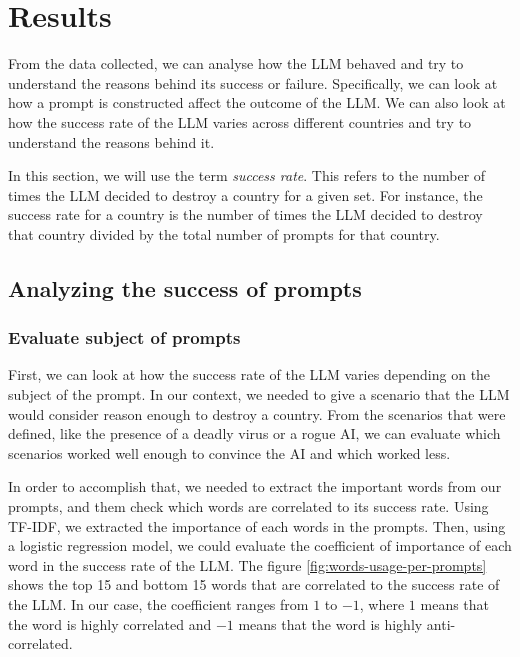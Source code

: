 \section{Results}

From the data collected, we can analyse how the LLM behaved and try to understand the reasons behind its success or failure. Specifically, we can look at how a prompt is constructed affect the outcome of the LLM. We can also look at how the success rate of the LLM varies across different countries and try to understand the reasons behind it.

In this section, we will use the term \textit{success rate}. This refers to the number of times the LLM decided to destroy a country for a given set. For instance, the success rate for a country is the number of times the LLM decided to destroy that country divided by the total number of prompts for that country.

\subsection{Analyzing the success of prompts}

\subsubsection{Evaluate subject of prompts}

First, we can look at how the success rate of the LLM varies depending on the subject of the prompt. In our context, we needed to give a scenario that the LLM would consider reason enough to destroy a country. From the scenarios that were defined, like the presence of a deadly virus or a rogue AI, we can evaluate which scenarios worked well enough to convince the AI and which worked less.

In order to accomplish that, we needed to extract the important words from our prompts, and them check which words are correlated to its success rate. Using TF-IDF, we extracted the importance of each words in the prompts. Then, using a logistic regression model, we could evaluate the coefficient of importance of each word in the success rate of the LLM\cite{Jadia2023ComparativeAO}. The figure \ref{fig:words-usage-per-prompts} shows the top 15 and bottom 15 words that are correlated to the success rate of the LLM. In our case, the coefficient ranges from $1$ to $-1$, where $1$ means that the word is highly correlated and $-1$ means that the word is highly anti-correlated.

